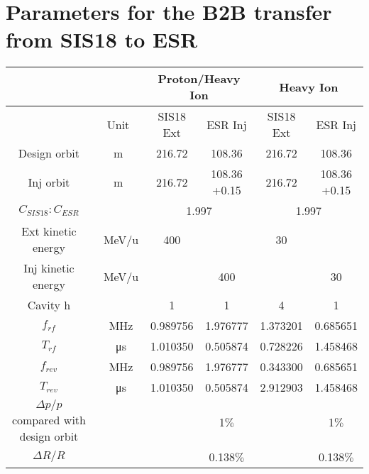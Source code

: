 \newpage
\section{Parameters for the B2B transfer from SIS18 to ESR}
\label{sec:18toESR}



% 
    \begin{longtable}{ | c | c | c | c | c | c |}
    \hline
		\rowcolor[gray]{0.8}
     	 &  & \multicolumn{2}{c|}{Proton/Heavy Ion} & \multicolumn{2}{c|}{Heavy Ion} \\ \hline
		 & Unit &	SIS18 Ext & ESR Inj & SIS18 Ext &	ESR Inj\\ \hline
Design orbit &	m &	 216.72&108.36&	216.72&108.36	\\ \hline
Inj orbit &	m &	 216.72&\tabincell{c}{108.36\\+0.15}&	216.72&\tabincell{c}{108.36\\+0.15}	\\ \hline
$C_{SIS18}:C_{ESR}$&	&	\multicolumn{2}{c|}{1.997}&\multicolumn{2}{c|}{1.997}	\\ \hline
\tabincell{c}{Ext kinetic\\ energy}&	\SI{}{\MeV/\atomicmassunit}&	400 & &30&	\\ \hline
\tabincell{c}{Inj kinetic\\ energy}&	\SI{}{\MeV/\atomicmassunit}&	&400&	&30	\\ \hline
Cavity h&	&1&1&4&1	\\ \hline
$f_{rf}$&\SI{}{\MHz}&	0.989756&1.976777&1.373201&0.685651	\\ \hline$T_{rf}$&\SI{}{\us}&	1.010350&0.505874&0.728226&1.458468\\ \hline
$f_{rev}$&\SI{}{\MHz}&	0.989756&1.976777&0.343300&0.685651\\ \hline
$T_{rev}$&\SI{}{\us}&	1.010350&0.505874&2.912903&1.458468\\ \hline
\tabincell{c}{$\Delta p/p$ compared \\with design orbit}&	&&1$\%$&&1$\%$\\ \hline
$\Delta R/R$&	&&0.138$\%$&&0.138$\%$\\ \hline

\end{longtable}
